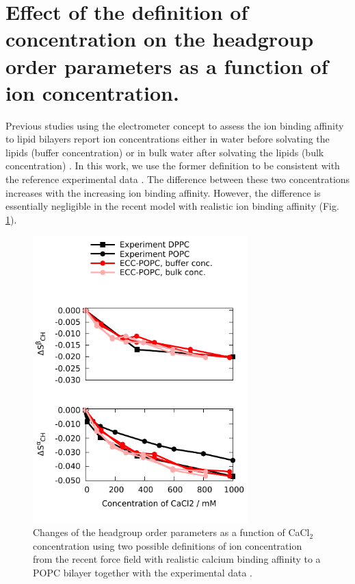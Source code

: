 \documentclass[journal=jpcbfk]{achemso}
\begin{document}
\section{Effect of the definition of concentration on the headgroup order parameters as a function of ion concentration.}\label{concentrationDEFsection}
Previous studies using the electrometer concept to assess the ion binding affinity to lipid
bilayers report ion concentrations either in water before solvating the lipids (buffer concentration) \cite{akutsu81,roux90,catte16}
or in bulk water after solvating the lipids (bulk concentration) \cite{altenbach84,melcr18}.
In this work, we use the former definition to be consistent with the reference
experimental data \cite{roux90}. The difference between these two concentrations increases
with the increasing ion binding affinity. However, the difference is essentially negligible
in the recent model \cite{melcr18} with realistic ion binding affinity (Fig. \ref{concentrationDEFfigure}).
\begin{figure}[]
  \centering
  \includegraphics[width=8.3cm]{../Figs/OP_ECC_POPC_DPPC_water_conc2_dppc_bulk.pdf}
  \caption{\label{concentrationDEFfigure}
    Changes of the headgroup order parameters as a function of CaCl$_2$ concentration using
    two possible definitions of ion concentration from the recent force field
    with realistic calcium binding affinity to a POPC bilayer \cite{melcr18}
    together with the experimental data \cite{akutsu81,altenbach84}. 
  }
\end{figure}
\end{document}

